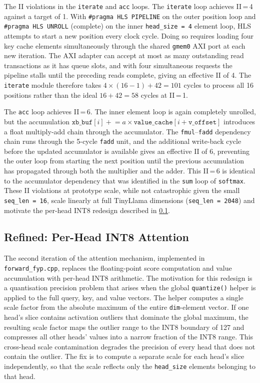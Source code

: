 The II violations in the \texttt{iterate} and
\texttt{acc} loops. The \texttt{iterate} loop achieves II\,=\,4 against
a target of 1. With \texttt{\#pragma HLS PIPELINE} on the outer
position loop and \texttt{\#pragma HLS UNROLL} (complete) on the inner
\texttt{head\_size\,=\,4} element loop, HLS attempts to start a new
position every clock cycle. Doing so requires loading four key cache
elements simultaneously through the shared \texttt{gmem0} AXI port at
each new iteration. The AXI adapter can accept at most as many
outstanding read transactions as it has queue slots, and with four
simultaneous requests the pipeline stalls until the preceding reads
complete, giving an effective II of 4. The
\texttt{iterate} module therefore takes $4 \times (16 - 1) + 42 = 101$
cycles to process all 16 positions rather than the ideal $16 + 42 =
58$ cycles at II\,=\,1.

The \texttt{acc} loop achieves II\,=\,6. The inner element loop is
again completely unrolled, but the accumulation
$\texttt{xb\_buf}[i] \mathrel{+}= a \times \texttt{value\_cache}[i +
\texttt{v\_offset}]$ introduces a float multiply-add chain through the
accumulator. The \texttt{fmul}--\texttt{fadd} dependency chain runs through
the 5-cycle \texttt{fadd} unit, and the additional write-back cycle before
the updated accumulator is available gives an effective II of 6, preventing the
outer loop from starting the next position until the previous
accumulation has propagated through both the multiplier and the adder.
This II\,=\,6 is identical to the accumulator dependency that was
identified in the \texttt{sum} loop of \texttt{softmax}. These II
violations at prototype scale, while not catastrophic given the small
\texttt{seq\_len = 16}, scale linearly at full TinyLlama dimensions
(\texttt{seq\_len = 2048}) and motivate the per-head INT8 redesign
described in \cref{subsec:attn_int8}.

\subsection{Refined: Per-Head INT8 Attention}
\label{subsec:attn_int8}

The second iteration of the attention mechanism, implemented in
\texttt{forward\_fyp.cpp}, replaces the floating-point score
computation and value accumulation with per-head INT8 arithmetic. The
motivation for this redesign is a quantisation precision problem that
arises when the global \texttt{quantize()} helper is applied to the
full query, key, and value vectors. The helper computes a single
scale factor from the absolute maximum of the entire \texttt{dim}-element
vector. If one head's slice contains activation outliers that dominate
the global maximum, the resulting scale factor maps the outlier range to
the INT8 boundary of 127 and compresses all other heads' values into a
narrow fraction of the INT8 range. This cross-head scale contamination
degrades the precision of every head that does not contain the outlier.
The fix is to compute a separate scale for each head's slice
independently, so that the scale reflects only the \texttt{head\_size}
elements belonging to that head.

